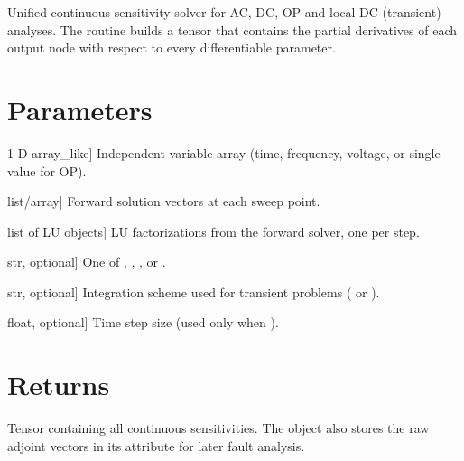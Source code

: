 \documentclass[letterpaper,10pt,english]{sphinxmanual}
\begin{document}
\begin{fulllineitems}

\pysigstartsignatures
\pysigline
{}
\pysigline
{}
\pysigstopsignatures
\sphinxAtStartPar
Unified continuous sensitivity solver for AC, DC, OP and local‑DC (transient) analyses.
The routine builds a  tensor that
contains the partial derivatives of each output node with respect to every
differentiable parameter.


\section{Parameters}
\label{\detokenize{adjoint_engine:id2}}\begin{description}
\sphinxlineitem{sweep\_axis}{[}1‑D array\_like{]}
\sphinxAtStartPar
Independent variable array (time, frequency, voltage, or single value for OP).

\sphinxlineitem{V\_forward}{[}list/array{]}
\sphinxAtStartPar
Forward solution vectors at each sweep point.

\sphinxlineitem{list\_of\_lus}{[}list of LU objects{]}
\sphinxAtStartPar
LU factorizations from the forward solver, one per step.

\sphinxlineitem{domain}{[}str, optional{]}
\sphinxAtStartPar
One of , , , or .

\sphinxlineitem{method}{[}str, optional{]}
\sphinxAtStartPar
Integration scheme used for transient problems ( or ).

\sphinxlineitem{dt}{[}float, optional{]}
\sphinxAtStartPar
Time step size (used only when ).

\end{description}


\section{Returns}
\label{\detokenize{adjoint_engine:id3}}\begin{description}
\sphinxAtStartPar
Tensor containing all continuous sensitivities.  The object also stores the
raw adjoint vectors in its  attribute for later fault analysis.

\end{description}

\end{fulllineitems}
\end{document}
